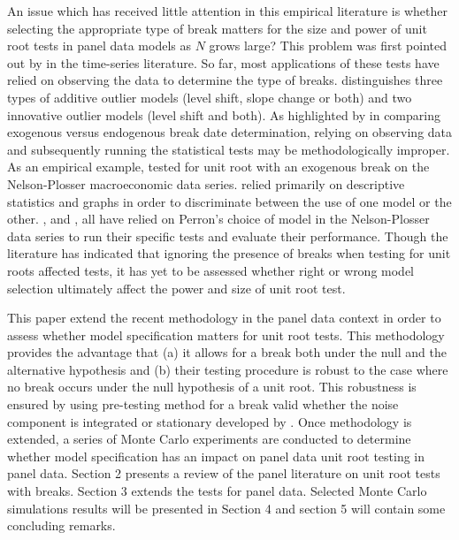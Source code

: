 \documentclass[a4paper,fleqn]{article} %
\begin{document}
An issue which has received little attention in this empirical literature is whether selecting the appropriate type of break matters for the size and power of unit root tests in panel data models as $N$ grows large? This problem was first pointed out by \citet{Lumsdaine:1997} in the time-series literature. So far, most applications of these tests have relied on observing the data to determine the type of breaks. \citet{Perron:1989} distinguishes three types of additive outlier models (level shift, slope change or both) and two innovative outlier models (level shift and both).  As highlighted by \citet{Zivot:1992} in comparing exogenous versus endogenous break date determination, relying on observing data and subsequently running the statistical tests may be methodologically improper. As an empirical example, \citet{Perron:1989} tested for unit root with an exogenous break on the Nelson-Plosser macroeconomic data series. \citet{Perron:1989} relied primarily on descriptive statistics and graphs in order to discriminate between the use of one model or the other. \citet{Zivot:1992}, \citet{Lumsdaine:1997} and \citet{Lee:2003}, all have relied on Perron's choice of model in the Nelson-Plosser data series to run their specific tests and evaluate their performance. Though the literature has indicated that ignoring the presence of breaks when testing for unit roots affected tests, it has yet to be assessed whether right or wrong model selection ultimately affect the power and size of unit root test. \par

This paper extend the recent \citet{KimPerron:2009} methodology in the panel data context in order to assess whether model specification matters for unit root tests. This methodology provides the advantage that (a) it allows for a break both under the null and the alternative hypothesis and (b) their testing procedure is robust to the case where no break occurs under the null hypothesis of a unit root. This robustness is ensured by using pre-testing method for a break valid whether the noise component is integrated or stationary developed by \citet{PerronYabu:2009}. Once \citet{KimPerron:2009} methodology is extended, a series of Monte Carlo experiments are conducted to determine whether model specification has an impact on panel data unit root testing in panel data. Section 2 presents a review of the panel literature on unit root tests with breaks. Section 3 extends the \citet{KimPerron:2009} tests for panel data. Selected Monte Carlo simulations results will be presented in Section 4 and section 5 will contain some concluding remarks.
\end{document}
